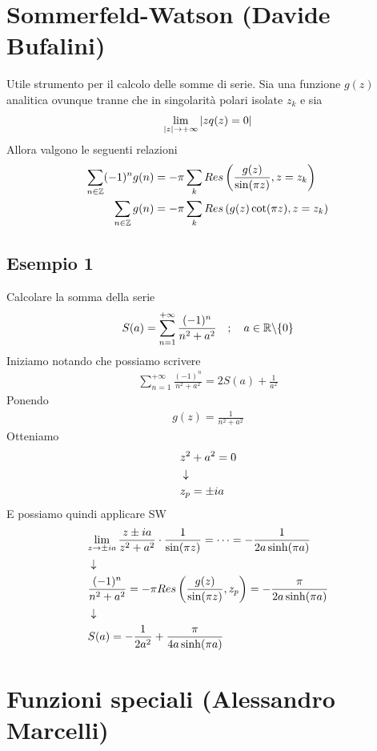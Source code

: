 \newpage

\section{Sommerfeld-Watson (Davide Bufalini)}

Utile strumento per il calcolo delle somme di serie. Sia una funzione $g(z)$ analitica ovunque tranne che in singolarità polari isolate $z_k$ e sia 
\begin{align}
	\underset{|z| \rightarrow +\infty}{\lim} \, |zq(z) =0|
\end{align}
Allora valgono le seguenti relazioni
\begin{align}
	\sum_{n\in \mathbb{Z}} (-1)^n g(n) &= -\pi \sum_{k} Res\left( \frac{g(z)}{\sin(\pi z)}, z=z_k \right)\\
	\sum_{n\in \mathbb{Z}} g(n)  &= -\pi \sum_{k} Res\left( g(z)\cot(\pi z), z=z_k \right)
\end{align}

\subsection{Esempio 1}

Calcolare la somma della serie
\begin{align}
	S(a) = \sum_{n=1}^{+\infty} \frac{(-1)^n}{n^2 + a^2} \quad ; \quad a \in \mathbb{R} \backslash \{0\}
\end{align}
Iniziamo notando che possiamo scrivere
\begin{align}
	\sum_{n=1}^{+\infty} \frac{(-1)^n}{n^2 + a^2} = 2S(a) + \frac{1}{a^2}
\end{align}
Ponendo
\begin{align}
	g(z)=\frac{1}{n^2 + a^2}
\end{align}
Otteniamo
\begin{align}
	&z^2 + a^2= 0 \\ &\downarrow \nonumber \\
	&z_p= \pm ia	
\end{align}
E possiamo quindi applicare SW
\begin{align}
	&\underset{z \rightarrow \pm ia}{\lim} \, \frac{z\pm ia}{z^2+a^2} \cdot \frac{1}{\sin(\pi z)} = \dots = -\frac{1}{2a\sinh(\pi a)} \\ &\downarrow \nonumber \\
	&\frac{(-1)^n}{n^2 + a^2} = -\pi Res \left(\frac{g(z)}{\sin(\pi z)}, z_p\right) = -\frac{\pi}{2a\sinh(\pi a)} \nonumber \\ &\downarrow \nonumber \\
	&S(a) = -\frac{1}{2a^2} + \frac{\pi}{4a\sinh(\pi a)}
\end{align}


\newpage

\section{Funzioni speciali (Alessandro Marcelli)}

